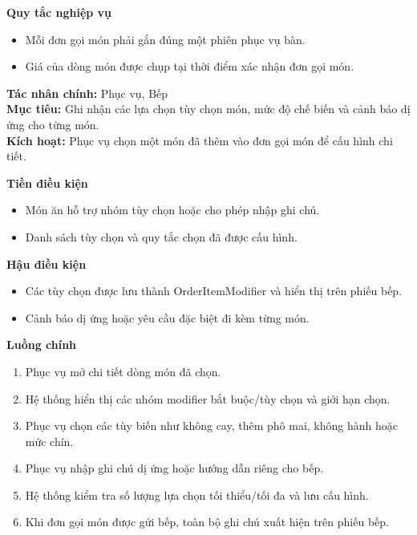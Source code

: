 \documentclass[11pt,a4paper]{article}
\begin{document}
\begin{usecasebox}[title={UC-ORD-01 --- Tạo đơn gọi món tại bàn}]
    \textbf{Quy tắc nghiệp vụ}
    \begin{itemize}[leftmargin=1.8em]
  \item Mỗi đơn gọi món phải gắn đúng một phiên phục vụ bàn.
  \item Giá của dòng món được chụp tại thời điểm xác nhận đơn gọi món.
\end{itemize}
    \end{usecasebox}



    \begin{usecasebox}[title={UC-ORD-02 --- Tùy biến món và ghi chú dị ứng}]
    \textbf{Tác nhân chính:} Phục vụ, Bếp\\
    \textbf{Mục tiêu:} Ghi nhận các lựa chọn tùy chọn món, mức độ chế biến và cảnh báo dị ứng cho từng món.\\
    \textbf{Kích hoạt:} Phục vụ chọn một món đã thêm vào đơn gọi món để cấu hình chi tiết.

    \medskip
    \textbf{Tiền điều kiện}
    \begin{itemize}[leftmargin=1.8em]
  \item Món ăn hỗ trợ nhóm tùy chọn hoặc cho phép nhập ghi chú.
  \item Danh sách tùy chọn và quy tắc chọn đã được cấu hình.
\end{itemize}

    \textbf{Hậu điều kiện}
    \begin{itemize}[leftmargin=1.8em]
  \item Các tùy chọn được lưu thành \textsf{OrderItemModifier} và hiển thị trên phiếu bếp.
  \item Cảnh báo dị ứng hoặc yêu cầu đặc biệt đi kèm từng món.
\end{itemize}

    \textbf{Luồng chính}
    \begin{enumerate}[leftmargin=1.8em]
  \item Phục vụ mở chi tiết dòng món đã chọn.
  \item Hệ thống hiển thị các nhóm modifier bắt buộc/tùy chọn và giới hạn chọn.
  \item Phục vụ chọn các tùy biến như không cay, thêm phô mai, không hành hoặc mức chín.
  \item Phục vụ nhập ghi chú dị ứng hoặc hướng dẫn riêng cho bếp.
  \item Hệ thống kiểm tra số lượng lựa chọn tối thiểu/tối đa và lưu cấu hình.
  \item Khi đơn gọi món được gửi bếp, toàn bộ ghi chú xuất hiện trên phiếu bếp.
\end{enumerate}


\end{usecasebox}
\end{document}
